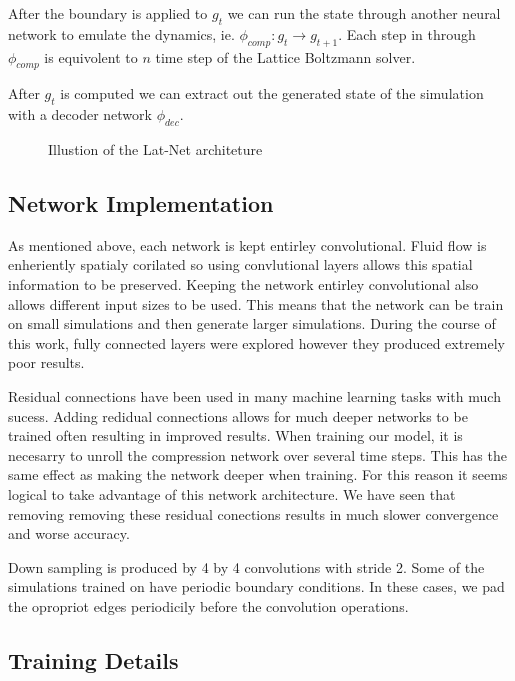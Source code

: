 \documentclass{article}
\begin{document}
After the boundary is applied to $g_t$ we can run the state through another neural network to emulate the dynamics, ie. $\phi_{comp}:g_{t} \rightarrow g_{t+1}$. Each step in through $\phi_{comp}$ is equivolent to $n$ time step of the Lattice Boltzmann solver.

After $g_t$ is computed we can extract out the generated state of the simulation with a decoder network $\phi_{dec}$. 

\begin{figure}[!t]
\centering
{}
\caption{Illustion of the Lat-Net architeture}
\label{fig_1}
\end{figure}



\subsection{Network Implementation}

As mentioned above, each network is kept entirley convolutional. Fluid flow is enheriently spatialy corilated so using convlutional layers allows this spatial information to be preserved. Keeping the network entirley convolutional also allows different input sizes to be used. This means that the network can be train on small simulations and then generate larger simulations. During the course of this work, fully connected layers were explored however they produced extremely poor results.

Residual connections have been used in many machine learning tasks with much sucess. Adding redidual connections allows for much deeper networks to be trained often resulting in improved results. When training our model, it is necesarry to unroll the compression network over several time steps. This has the same effect as making the network deeper when training. For this reason it seems logical to take advantage of this network architecture. We have seen that removing removing these residual conections results in much slower convergence and worse accuracy.

Down sampling is produced by 4 by 4 convolutions with stride 2. Some of the simulations trained on have periodic boundary conditions. In these cases, we pad the opropriot edges periodicily before the convolution operations.


\subsection{Training Details}
\end{document}
